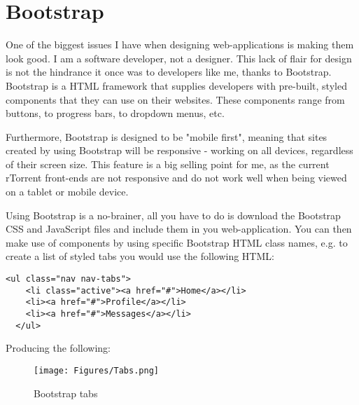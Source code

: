 
\section{Bootstrap}
One of the biggest issues I have when designing web-applications is making them look good. I am a software developer, not a designer. This lack of flair for design is not the hindrance it once was to developers like me, thanks to Bootstrap\cite{Bootstrap}. Bootstrap is a HTML framework that supplies developers with pre-built, styled components that they can use on their websites. These components range from buttons, to progress bars, to dropdown menus, etc.

Furthermore, Bootstrap is designed to be "mobile first", meaning that sites created by using Bootstrap will be responsive - working on all devices, regardless of their screen size. This feature is a big selling point for me, as the current rTorrent front-ends are not responsive and do not work well when being viewed on a tablet or mobile device.

Using Bootstrap is a no-brainer, all you have to do is download the Bootstrap CSS and JavaScript files and include them in you web-application. You can then make use of components by using specific Bootstrap HTML class names, e.g. to create a list of styled tabs you would use the following HTML:

\vspace{20px}
\begin{lstlisting}[caption=Bootstrap tabs HTML code]
  <ul class="nav nav-tabs">
    <li class="active"><a href="#">Home</a></li>
    <li><a href="#">Profile</a></li>
    <li><a href="#">Messages</a></li>
  </ul>
\end{lstlisting}


Producing the following: 

\begin{figure}[h!]
  \centering
    \texttt{[image: Figures/Tabs.png]}
  \caption{Bootstrap tabs}
\end{figure}














